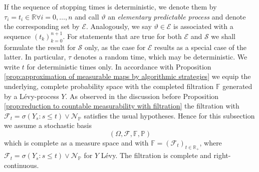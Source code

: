 \documentclass[11pt,a4paper,twoside,openany]{report}
\numberwithin{equation}{section}
\theoremstyle{plain} %
\theoremstyle{definition} %
\theoremstyle{remark} %
\begin{document}
\bigbreak
If the sequence of stopping times is deterministic, we denote them by \(\tau_i=t_i\in\mathbb{R}\forall i=0,\dots,n\) and call \(\vartheta\) an \textit{elementary predictable process} and denote the corresponding set by \(\mathcal{E}\). Analogously, we say \(\vartheta\in\mathcal{E}\) is associated with a sequence \((t_k)_{k=0}^{n+1}\).
For statements that are true for both \(\mathcal{E}\) and \(\mathcal{S}\) we shall formulate the result for \(\mathcal{S}\) only, as the case for \(\mathcal{E}\) results as a special case of the latter. In particular, \(\tau\) denotes a random time, which may be deterministic. We write \(t\) for deterministic times only. 
In accordance with Proposition \ref{prop:approximation of measurable maps by algorithmic strategies} we equip the underlying, complete probability space with the completed filtration \(\mathbb{F}\) generated by a Lévy-process \(Y\). As observed in the discussion before Proposition \ref{prop:reduction to countable measurability with filtration} the filtration with \(\mathcal{F}_t=\sigma(Y_s:s\leq t)\vee \mathcal{N}_{\mathbb{P}}\) satisfies the usual hypotheses. Hence for this subsection we assume a stochastic basis
\begin{equation}\label{eq:stochastic basis satisfying usual hypotheses}
    (\Omega,\mathcal{F},\mathbb{F},\mathbb{P})
\end{equation}
which is complete as a measure space and with \(\mathbb{F}=(\mathcal{F}_t)_{t\in\mathbb{R}_+}\), where \(\mathcal{F}_t=\sigma(Y_s:s\leq t)\vee \mathcal{N}_{\mathbb{P}}\) for \(Y\) Lévy. The filtration is complete and right-continuous.
\end{document}
